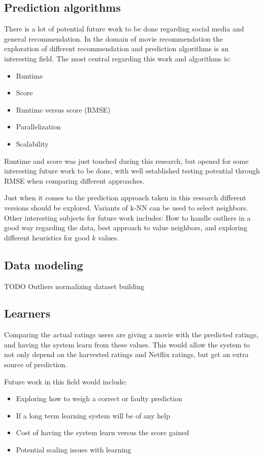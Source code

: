 \subsection{Prediction algorithms}
There is a lot of potential future work to be done regarding social media and general recommendation. In the domain of movie recommendation the exploration of different recommendation and prediction algorithms is an interesting field. The most central regarding this work and algorithms is:
\begin{itemize}
    \item Runtime
    \item Score
    \item Runtime versus score (RMSE)
    \item Parallelization
    \item Scalability
\end{itemize}
Runtime and score was just touched during this research, but opened for some interesting future work to be done, with well established testing potential through RMSE when comparing different approaches.

Just when it comes to the prediction approach taken in this research different versions should be explored. Variants of k-NN can be used to select neighbors. Other interesting subjects for future work includes: How to handle outliers in a good way regarding the data, best approach to value neighbors, and exploring different heuristics for good $k$ values.


\subsection{Data modeling}
TODO
Outliers  normalizing dataset building


\subsection{Learners}
Comparing the actual ratings users are giving a movie with the predicted ratings, and having the system learn from these values. This would allow the system to not only depend on the harvested ratings and Netflix ratings, but get an extra source of prediction.

Future work in this field would include:
\begin{itemize}
    \item Exploring how to weigh a correct or faulty prediction
    \item If a long term learning system will be of any help
    \item Cost of having the system learn versus the score gained
    \item Potential scaling issues with learning
\end{itemize}



